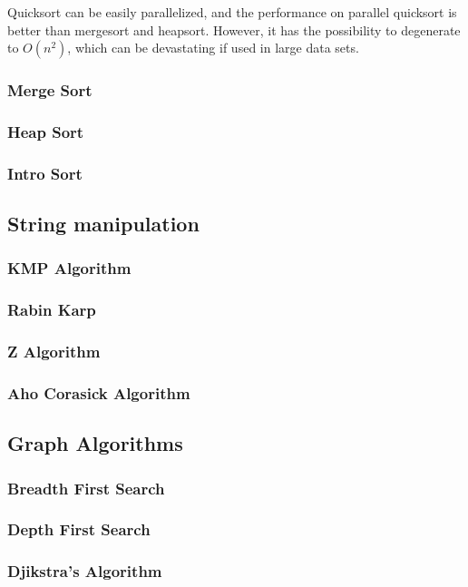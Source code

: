 \documentclass[10pt,landscape,twocolumn]{article}
\begin{document}
Quicksort can be easily parallelized, and the performance on parallel quicksort is better than mergesort and heapsort. However, it has the possibility to degenerate to $O(n^2)$, which can be devastating if used in large data sets.

\subsubsection{Merge Sort}
\subsubsection{Heap Sort}
\subsubsection{Intro Sort}
\subsection{String manipulation}
\subsubsection{KMP Algorithm}
\subsubsection{Rabin Karp}
\subsubsection{Z Algorithm}
\subsubsection{Aho Corasick Algorithm}

\subsection{Graph Algorithms}
\subsubsection{Breadth First Search}
\subsubsection{Depth First Search}
\subsubsection{Djikstra's Algorithm}
\end{document}
